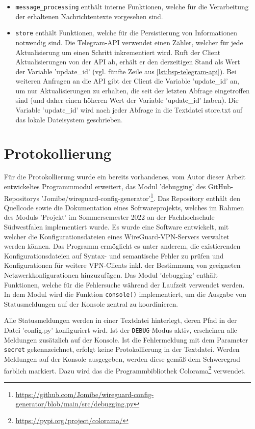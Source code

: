 \begin{itemize}
\item \lstinline{message_processing} enthält interne Funktionen, welche für die Verarbeitung der erhaltenen Nachrichtentexte vorgesehen sind. 
\item \lstinline{store} enthält Funktionen, welche für die Persistierung von Informationen notwendig sind. Die Telegram-API verwendet einen Zähler, welcher für jede Aktualisierung um einen Schritt inkrementiert wird. Ruft der Client Aktualisierungen von der API ab, erhält er den derzeitigen Stand als Wert der Variable 'update\_id' (vgl. fünfte Zeile aus \autoref{lst:bsp-telegram-api}). Bei weiteren Anfragen an die API gibt der Client die Variable 'update\_id' an, um nur Aktualisierungen zu erhalten, die seit der letzten Abfrage eingetroffen sind (und daher einen höheren Wert der Variable 'update\_id' haben). Die Variable 'update\_id' wird nach jeder Abfrage in die Textdatei store.txt auf das lokale Dateisystem geschrieben.
\end{itemize}

\section{Protokollierung}
\label{sec:protokollierung}

Für die Protokollierung wurde ein bereits vorhandenes, vom Autor dieser Arbeit entwickeltes Programmmodul erweitert, das Modul 'debugging' des GitHub-Repositorys 'Jomibe/wireguard-config-generator'\footnote{\url{https://github.com/Jomibe/wireguard-config-generator/blob/main/src/debugging.py}}. Das Repository enthält den Quellcode sowie die Dokumentation eines Softwareprojekts, welches im Rahmen des Moduls 'Projekt' im Sommersemester 2022 an der Fachhochschule Südwestfalen implementiert wurde. Es wurde eine Software entwickelt, mit welcher die Konfigurationsdateien eines WireGuard-VPN-Servers verwaltet werden können. Das Programm ermöglicht es unter anderem, die existierenden Konfigurationsdateien auf Syntax- und semantische Fehler zu prüfen und Konfigurationen für weitere VPN-Clients inkl. der Bestimmung von geeigneten Netzwerkkonfigurationen hinzuzufügen. Das Modul 'debugging' enthält Funktionen, welche für die Fehlersuche während der Laufzeit verwendet werden. In dem Modul wird die Funktion \lstinline{console()} implementiert, um die Ausgabe von Statusmeldungen auf der Konsole zentral zu koordinieren. 

Alle Statusmeldungen werden in einer Textdatei hinterlegt, deren Pfad in der Datei 'config.py' konfiguriert wird. Ist der \lstinline{DEBUG}-Modus aktiv, erscheinen alle Meldungen zusätzlich auf der Konsole. Ist die Fehlermeldung mit dem Parameter \lstinline{secret} gekennzeichnet, erfolgt keine Protokollierung in der Textdatei. Werden Meldungen auf der Konsole ausgegeben, werden diese gemäß dem Schweregrad farblich markiert. Dazu wird das die Programmbibliothek Colorama\footnote{\url{https://pypi.org/project/colorama/}} verwendet.

